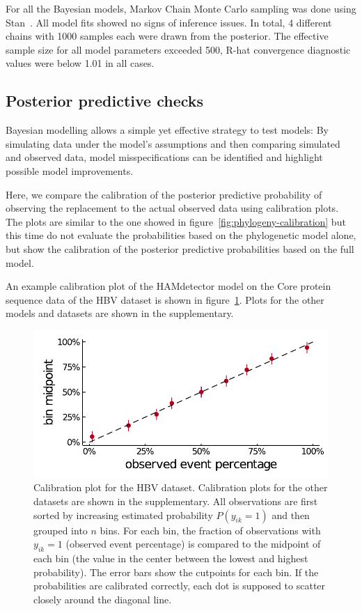 \documentclass[fleqn,11pt]{SelfArx} %
\begin{document}
For all the Bayesian models, Markov Chain Monte Carlo sampling was done using Stan~\cite{Stan2021}. All model fits showed no signs of inference issues. In total, 4 different chains with 1000 samples each were drawn from the posterior. The effective sample size for all model parameters exceeded 500, R-hat convergence diagnostic values were below 1.01 in all cases.

\subsection*{Posterior predictive checks}

Bayesian modelling allows a simple yet effective strategy to test models: By simulating data under the model's assumptions and then comparing simulated and observed data, model misspecifications can be identified and highlight possible model improvements.

Here, we compare the calibration of the posterior predictive probability of observing the replacement to the actual observed data using calibration plots.
The plots are similar to the one showed in figure~\ref{fig:phylogeny-calibration} but this time do not evaluate the probabilities based on the phylogenetic model alone, but show the calibration of the posterior predictive probabilities based on the full model.

An example calibration plot of the HAMdetector model on the Core protein sequence data of the HBV dataset is shown in figure~\ref{fig:calibration}. Plots for the other models and datasets are shown in the supplementary.

\begin{figure}[!ht]
  \includegraphics[width=1\linewidth]{plots/phylogeny_calibration.pdf}
  \caption{Calibration plot for the HBV dataset. Calibration plots for the other datasets are shown in the supplementary.
  All observations are first sorted by increasing estimated probability \(P(y_{ik}=1)\) and then grouped into \(n\) bins.
  For each bin, the fraction of observations with \(y_{ik}=1\) (observed event percentage) is compared to the midpoint of each bin (the value in the center between the lowest and highest probability). The error bars show the cutpoints for each bin. If the probabilities are calibrated correctly, each dot is supposed to scatter closely around the diagonal line.}
  \label{fig:calibration}
\end{figure}
\end{document}
